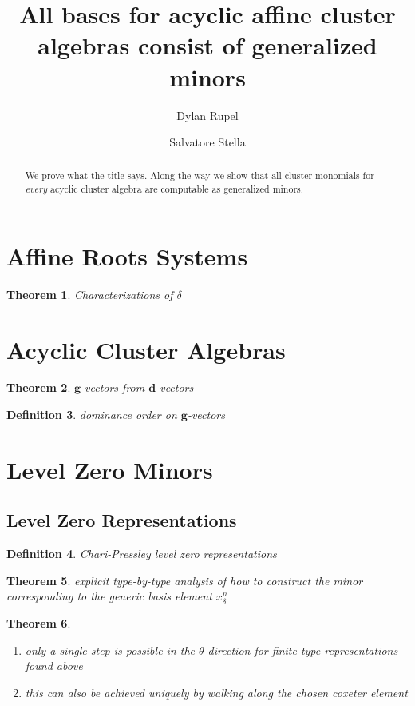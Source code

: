 \documentclass{amsart}
\title{All bases for acyclic affine cluster algebras consist of generalized minors}
\author{Dylan Rupel}
\author{Salvatore Stella}
\newtheorem{theorem}{Theorem}
\newtheorem{definition}[theorem]{Definition}
\newcommand{\bfd}{\mathbf{d}}
\newcommand{\bfg}{\mathbf{g}}
\begin{document}
  \begin{abstract}
    We prove what the title says.
    Along the way we show that all cluster monomials for \emph{every} acyclic cluster algebra are computable as generalized minors.
  \end{abstract}
  \maketitle

  \section{Affine Roots Systems}
    \begin{theorem}
      Characterizations of $\delta$
    \end{theorem}

  \section{Acyclic Cluster Algebras}
    \begin{theorem}
      $\bfg$-vectors from $\bfd$-vectors
    \end{theorem}
 
    \begin{definition}
      dominance order on $\bfg$-vectors
    \end{definition}

  \section{Level Zero Minors}
    \subsection{Level Zero Representations}
    \begin{definition}
      Chari-Pressley level zero representations
    \end{definition}

    \begin{theorem}
      explicit type-by-type analysis of how to construct the minor corresponding to the generic basis element $x_{\delta}^n$
    \end{theorem}

    \begin{theorem}
      \mbox{}
      \begin{enumerate}
        \item only a single step is possible in the $\theta$ direction for finite-type representations found above
        \item this can also be achieved uniquely by walking along the chosen coxeter element
      \end{enumerate}
    \end{theorem}
\end{document}
